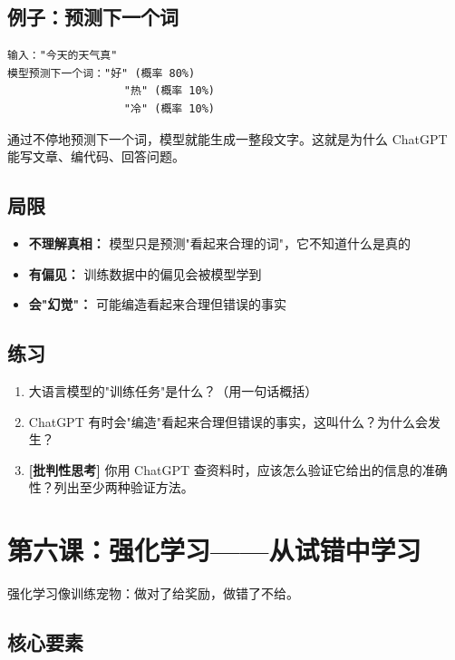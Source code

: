 \documentclass[a4paper,12pt]{ctexart}
\begin{document}
\subsection*{例子：预测下一个词}

\begin{verbatim}
输入："今天的天气真"
模型预测下一个词："好" (概率 80%)
                  "热" (概率 10%)
                  "冷" (概率 10%)
\end{verbatim}

通过不停地预测下一个词，模型就能生成一整段文字。这就是为什么 ChatGPT 能写文章、编代码、回答问题。

\subsection*{局限}

\begin{itemize}
  \item \textbf{不理解真相：} 模型只是预测"看起来合理的词"，它不知道什么是真的
  \item \textbf{有偏见：} 训练数据中的偏见会被模型学到
  \item \textbf{会"幻觉"：} 可能编造看起来合理但错误的事实
\end{itemize}

\subsection*{练习}

\begin{enumerate}
  \item 大语言模型的"训练任务"是什么？（用一句话概括）
  \item ChatGPT 有时会"编造"看起来合理但错误的事实，这叫什么？为什么会发生？
  \item \textbf{[批判性思考]} 你用 ChatGPT 查资料时，应该怎么验证它给出的信息的准确性？列出至少两种验证方法。
\end{enumerate}

\section*{第六课：强化学习——从试错中学习}

强化学习像训练宠物：做对了给奖励，做错了不给。

\subsection*{核心要素}
\end{document}
